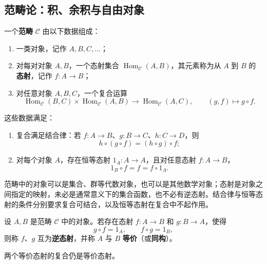 \subsection{范畴论：积、余积与自由对象}

\begin{definition}[范畴]\label{def:category}
一个\textbf{范畴} $\mathcal C$ 由以下数据组成：
\begin{enumerate}[label=(\arabic*)]
  \item 一类对象，记作 $A,B,C,\ldots$；
  \item 对每对对象 $A,B$，一个态射集合 $\operatorname{Hom}_{\mathcal C}(A,B)$，其元素称为从 $A$ 到 $B$ 的\textbf{态射}，记作 $f:A\to B$；
  \item 对任意对象 $A,B,C$，一个复合运算
  \[
    \operatorname{Hom}_{\mathcal C}(B,C)\times
    \operatorname{Hom}_{\mathcal C}(A,B)
    \longrightarrow \operatorname{Hom}_{\mathcal C}(A,C),
    \qquad (g,f)\longmapsto g\circ f.
  \]
\end{enumerate}
这些数据满足：
\begin{enumerate}[label=(\arabic*),resume]
  \item 复合满足结合律：若 $f:A\to B$、$g:B\to C$、$h:C\to D$，则
  \[
    h\circ(g\circ f)=(h\circ g)\circ f;
  \]
  \item 对每个对象 $A$，存在恒等态射 $1_A:A\to A$，且对任意态射 $f:A\to B$，
  \[
    1_B\circ f=f=f\circ1_A.
  \]
\end{enumerate}
\end{definition}

\begin{purplenote}
范畴中的对象可以是集合、群等代数对象，也可以是其他数学对象；态射是对象之间指定的映射，未必是通常意义下的集合函数，也不必有逆态射。结合律与恒等态射的条件分别要求复合可结合，以及恒等态射在复合中不起作用。
\end{purplenote}

\begin{definition}\label{def:equivalent-objects}
设 $A,B$ 是范畴 $\mathcal C$ 中的对象。若存在态射 $f:A\to B$ 和 $g:B\to A$，使得
\[
  g\circ f=1_A,\qquad f\circ g=1_B,
\]
则称 $f$、$g$ 互为\textbf{逆态射}，并称 $A$ 与 $B$ \textbf{等价}（或\textbf{同构}）。
\end{definition}

\begin{purplenote}
两个等价态射的复合仍是等价态射。
\end{purplenote}

